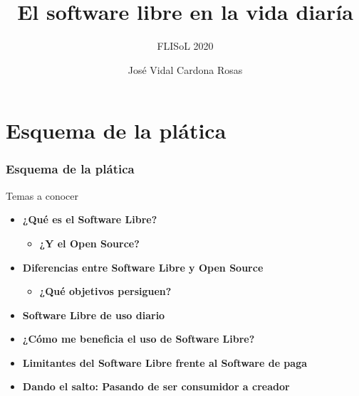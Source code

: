 \documentclass{beamer}
\title{El software libre en la vida diaría}
\subtitle{FLISoL 2020}
\author{José Vidal Cardona Rosas}
\institute{ENES, Morelia Mich.}
\begin{document}
    \begin{frame}
        \titlepage
    \end{frame}

    \section{Esquema de la plática}
    \begin{frame}
        \frametitle{Esquema de la plática}
        \begin{block}{Temas a conocer}
            \begin{itemize}
                \item \textbf{¿Qué es el Software Libre?}
                \begin{itemize}
                    \item \textbf{¿Y el Open Source?}
                \end{itemize}
                \item \textbf{Diferencias entre Software Libre 
                y Open Source}
                \begin{itemize}
                    \item \textbf{¿Qué objetivos persiguen?}
                \end{itemize}
                \item \textbf{Software Libre de uso diario}
                \item \textbf{¿Cómo me beneficia el uso de
                Software Libre?}
                \item \textbf{Limitantes del Software Libre
                frente al Software de paga}
                \item \textbf{Dando el salto: Pasando de ser
                consumidor a creador}
            \end{itemize}
        \end{block}
    \end{frame}
\end{document}
